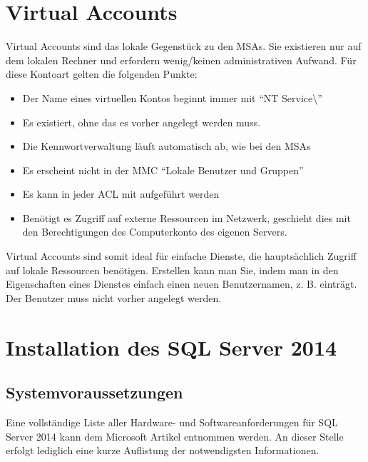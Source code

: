     \section{Virtual Accounts}
      Virtual Accounts sind das lokale Gegenstück zu den MSAs. Sie existieren nur
      auf dem lokalen Rechner und erfordern wenig/keinen administrativen Aufwand.
      Für diese Kontoart gelten die folgenden Punkte:
      \begin{itemize}
          \item Der Name eines virtuellen Kontos beginnt immer mit \enquote{NT
          Service\textbackslash}
          \item Es existiert, ohne das es vorher angelegt werden muss. 
          \item Die Kennwortverwaltung läuft automatisch ab, wie bei den MSAs
          \item Es erscheint nicht in der MMC \enquote{Lokale Benutzer und
          Gruppen}
          \item Es kann in jeder ACL mit aufgeführt werden
          \item Benötigt es Zugriff auf externe Ressourcen im Netzwerk, geschieht
          dies mit den Berechtigungen des Computerkonto des eigenen Servers.
      \end{itemize}
      Virtual Accounts sind somit ideal für einfache Dienste, die hauptsächlich
      Zugriff auf lokale Ressourcen benötigen. Erstellen kann man Sie, indem man
      in den Eigenschaften eines Dienstes einfach einen neuen Benutzernamen, z. B.
       einträgt. Der Benutzer muss
      nicht vorher angelegt werden.
      \begin{literaturinternet}
        \item \cite{vafduw78as2008r2}
        \item \cite{msavvaiws2008r2}
      \end{literaturinternet}
    \section{Installation des SQL Server 2014}
      \subsection{Systemvoraussetzungen}
        Eine vollständige Liste aller Hardware- und Softwareanforderungen für
        SQL Server 2014 kann dem Microsoft Artikel \parencite{ms143506}
        entnommen werden. An dieser Stelle erfolgt lediglich eine kurze Auflistung
        der notwendigsten Informationen.
